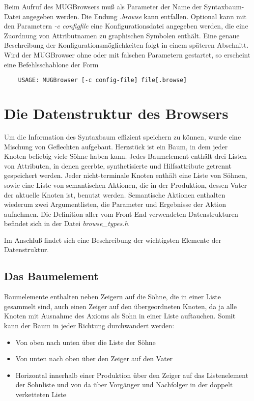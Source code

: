 Beim Aufruf des MUGBrowsers mu\ss{} als Parameter der Name der Syntaxbaum-Datei angegeben werden. Die Endung {\it .browse} kann entfallen.
Optional kann mit den Parametern {\it -c configfile} eine Konfigurationsdatei angegeben werden, die eine Zuordnung von Attributnamen zu graphischen
Symbolen enth\"alt. Eine genaue Beschreibung der Konfigurationsm\"oglichkeiten folgt in einem sp\"ateren Abschnitt. Wird der MUGBrowser ohne oder mit
falschen Parametern gestartet, so erscheint eine Befehlsschablone der Form
\begin{small}\begin{verbatim}
	USAGE: MUGBrowser [-c config-file] file[.browse]
\end{verbatim}\end{small}

\section{Die Datenstruktur des Browsers}

Um die Information des Syntaxbaum effizient speichern zu k\"onnen, wurde eine Mischung von Geflechten aufgebaut. Herzst\"uck ist ein Baum, in dem jeder
Knoten beliebig viele S\"ohne haben kann. Jedes Baumelement enth\"alt drei Listen von Attributen, in denen geerbte, synthetisierte und Hilfsattribute
getrennt gespeichert werden. Jeder nicht-terminale Knoten enth\"alt eine Liste von S\"ohnen, sowie eine Liste von semantischen Aktionen, die in der
Produktion, dessen Vater der aktuelle Knoten ist, benutzt werden. Semantische Aktionen enthalten wiederum zwei Argumentlisten, die Parameter und
Ergebnisse der Aktion aufnehmen. Die Definition aller vom Front-End verwendeten Datenstrukturen befindet sich in der Datei {\it browse\_types.h}.

Im Anschlu\ss{} findet sich eine Beschreibung der wichtigsten Elemente der Datenstruktur.

\subsection{Das Baumelement}

Baumelemente enthalten neben Zeigern auf die S\"ohne, die in einer Liste gesammelt sind, auch einen Zeiger auf den \"ubergeordneten Knoten, da ja alle Knoten mit Ausnahme des Axioms als Sohn in einer Liste auftauchen. Somit kann der Baum in jeder Richtung
durchwandert werden:
\begin{itemize}
\item{Von oben nach unten \"uber die Liste der S\"ohne}
\item{Von unten nach oben \"uber den Zeiger auf den Vater}
\item{Horizontal innerhalb einer Produktion \"uber den Zeiger auf das Listenelement der Sohnliste und von da \"uber Vorg\"anger und Nachfolger in der
doppelt verketteten Liste}
\end{itemize}

